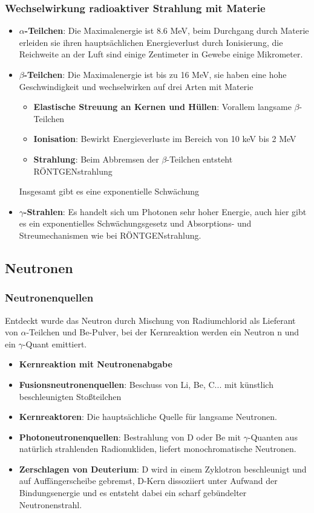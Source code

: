 \documentclass[12pt,a4paper,ngerman]{article}
\begin{document}
\subsubsection*{Wechselwirkung radioaktiver Strahlung mit Materie}
\begin{itemize}
\item \textbf{$\alpha$-Teilchen}: Die Maximalenergie ist 8.6 MeV, beim Durchgang durch Materie erleiden sie ihren hauptsächlichen Energieverlust durch Ionisierung, die Reichweite an der Luft sind einige Zentimeter in Gewebe einige Mikrometer. 
\item \textbf{$\beta$-Teilchen}: Die Maximalenergie ist bis zu 16 MeV, sie haben eine hohe Geschwindigkeit und wechselwirken auf drei Arten mit Materie
\begin{itemize}
\item \textbf{Elastische Streuung an Kernen und Hüllen}: Vorallem langsame $\beta$-Teilchen
\item \textbf{Ionisation}: Bewirkt Energieverluste im Bereich von 10 keV bis 2 MeV
\item \textbf{Strahlung}: Beim Abbremsen der $\beta$-Teilchen entsteht RÖNTGENstrahlung
\end{itemize}
Insgesamt gibt es eine exponentielle Schwächung
\item \textbf{$\gamma$-Strahlen}: Es handelt sich um Photonen sehr hoher Energie, auch hier gibt es ein exponentielles Schwächungsgesetz und Absorptions- und Streumechanismen wie bei RÖNTGENstrahlung. 
\end{itemize}



\subsection{Neutronen}
\subsubsection*{Neutronenquellen}

Entdeckt wurde das Neutron durch Mischung von Radiumchlorid als Lieferant von $\alpha$-Teilchen und Be-Pulver, bei der Kernreaktion werden ein Neutron n und ein $\gamma$-Quant emittiert. 
\begin{itemize}
\item \textbf{Kernreaktion mit Neutronenabgabe}
\item \textbf{Fusionsneutronenquellen}: Beschuss von Li, Be, C... mit künstlich beschleunigten Stoßteilchen
\item \textbf{Kernreaktoren}: Die hauptsächliche Quelle für langsame Neutronen. 
\item \textbf{Photoneutronenquellen}: Bestrahlung von D oder Be mit $\gamma$-Quanten aus natürlich strahlenden Radionukliden, liefert monochromatische Neutronen.
\item \textbf{Zerschlagen von Deuterium}: D wird in einem Zyklotron beschleunigt und auf Auffängerscheibe gebremst, D-Kern dissoziiert unter Aufwand der Bindungsenergie und es entsteht dabei ein scharf gebündelter Neutronenstrahl. 
\end{itemize}
\end{document}
